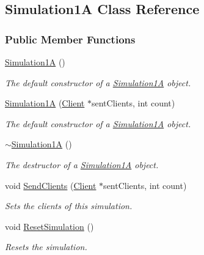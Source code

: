 \hypertarget{class_simulation1_a}{}\subsection{Simulation1A Class Reference}
\label{class_simulation1_a}
\subsubsection*{Public Member Functions}
\begin{DoxyCompactItemize}
\item 
\hyperlink{class_simulation1_a_a814b7c8b8412e631f31089ff84a3ac9d}{Simulation1A} ()
\begin{DoxyCompactList}\small\item\em The default constructor of a \hyperlink{class_simulation1_a}{Simulation1A} object. \end{DoxyCompactList}\item 
\hyperlink{class_simulation1_a_ac576ab3c8817e7ee476a8234b9652715}{Simulation1A} (\hyperlink{class_client}{Client} $\ast$sent\+Clients, int count)
\begin{DoxyCompactList}\small\item\em The default constructor of a \hyperlink{class_simulation1_a}{Simulation1A} object. \end{DoxyCompactList}\item 
\hyperlink{class_simulation1_a_a1fadc48d0f5f137192c8b404e3a22d6a}{$\sim$\+Simulation1A} ()
\begin{DoxyCompactList}\small\item\em The destructor of a \hyperlink{class_simulation1_a}{Simulation1A} object. \end{DoxyCompactList}\item 
void \hyperlink{class_simulation1_a_ac94ce808c353225b8c1ebc8d1119983b}{Send\+Clients} (\hyperlink{class_client}{Client} $\ast$sent\+Clients, int count)
\begin{DoxyCompactList}\small\item\em Sets the clients of this simulation. \end{DoxyCompactList}\item 
void \hyperlink{class_simulation1_a_a5fbe6a6427ad459307f687148141c53b}{Reset\+Simulation} ()
\begin{DoxyCompactList}\small\item\em Resets the simulation. \end{DoxyCompactList}\item 

\end{DoxyCompactItemize}
